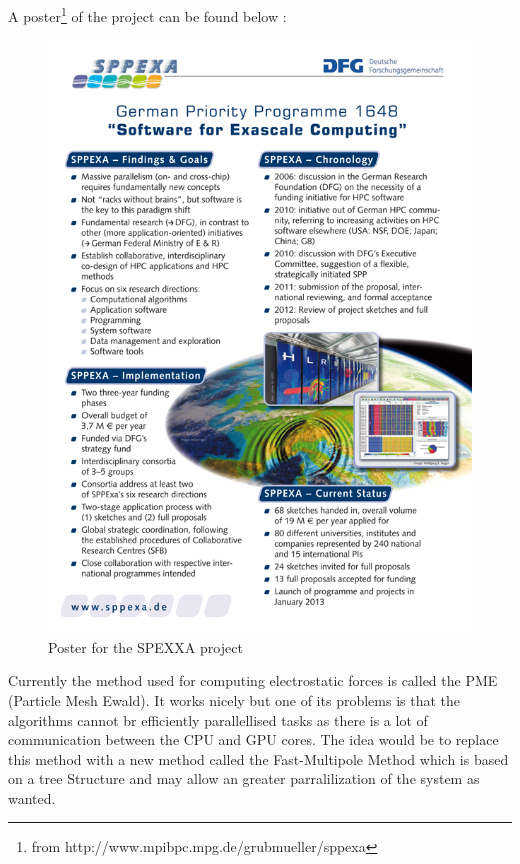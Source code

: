 \documentclass[11pt,twoside,a4paper]{report}
\begin{document}
A poster\footnote{from http://www.mpibpc.mpg.de/grubmueller/sppexa}   of the project can be found below :

\begin{figure}[H]
\includegraphics[scale=2]{sppexa-poster}
 \centering 
\caption{Poster for the SPEXXA project}
\label{fig:poster}
\end{figure}


Currently the method used for computing electrostatic forces is called the PME (Particle Mesh Ewald). It works nicely but one of its problems is that the algorithms cannot br efficiently parallellised tasks as there is a lot of communication between the CPU and GPU cores. The idea would be to replace this method with a new method called the Fast-Multipole Method which is based on a tree Structure and may allow an greater parralilization of the system as wanted.\\
\end{document}
